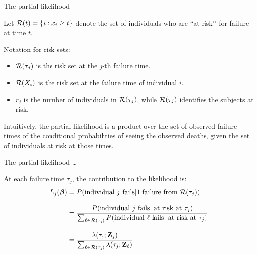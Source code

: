 \documentclass[ignorenonframetext,]{beamer}
\newcommand{\bbeta}{\mbox{\boldmath$\beta$}}
\begin{document}
\begin{frame}{%
\protect\hypertarget{the-partial-likelihood}{%
The partial likelihood}}

Let \({\cal R}(t) = \{ i: x_i \ge t \}\) denote the set of individuals
who are ``at risk’’ for failure at time \(t\).

Notation for risk sets:

\begin{itemize}
\item
  \({\cal R}(\tau_j)\) is the risk set at the \(j\)-th failure time.
\item
  \({\cal R}(X_i)\) is the risk set at the failure time of individual
  \(i\).
\item
  \(r_j\) is the number of individuals in \({\cal R}(\tau_j)\), while
  \({\cal R}(\tau_j)\) identifies the subjects at risk.
\end{itemize}

Intuitively, the partial likelihood is a product over the set of
observed failure times of the conditional probabilities of seeing the
observed deaths, given the set of individuals at risk at those times.

\end{frame}

\begin{frame}{%
\protect\hypertarget{the-partial-likelihood-1}{%
The partial likelihood \ldots}}

At each failure time \(\tau_j\), the contribution to the likelihood is:
\begin{align*}
 L_j(\bbeta)   &= 
     P(\mbox{individual $j$ fails} | 1 \mbox{ failure from }{\cal R}(\tau_j) )\\[2ex]
 &=  \frac
  {  P(\mbox{individual } j \mbox{ fails} | \mbox{ at risk at } \tau_j)}
       {\sum_{\ell \in {\cal R}(\tau_j)}
      P(\mbox{individual } \ell \mbox{ fails} | \mbox{ at risk at } \tau_j) }
\\[2ex]
 &= 
    \frac
  {  \lambda(\tau_j; {\bf Z}_j) }  {\sum_{\ell \in {\cal R}(\tau_j)}
       \lambda(\tau_j; {\bf Z}_\ell) } \\
\end{align*}

\end{frame}
\end{document}

